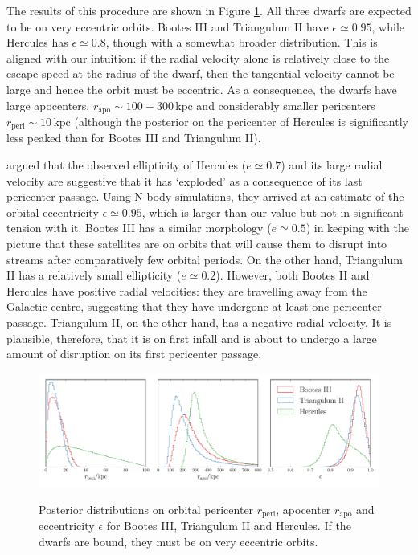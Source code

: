 \documentclass[useAMS,twocolumn,usenatbib]{mn2e}
\def\kpc{{\,\mathrm{kpc}}}
\def\rp{{r_\mathrm{peri}}}
\def\ra{{r_\mathrm{apo}}}
\def\ecc{{\epsilon}}
\begin{document}
The results of this procedure are shown in Figure \ref{fig:bootriherc}. 
All three dwarfs are expected to be on very eccentric orbits. 
Bootes III and Triangulum II have $\epsilon \simeq 0.95$, while Hercules has $\epsilon \simeq 0.8$, though with a somewhat broader distribution. 
This is aligned with our intuition: if the radial velocity alone is relatively close to the escape speed at the radius of the dwarf, then the tangential velocity cannot be large and hence the orbit must be eccentric. 
As a consequence, the dwarfs have large apocenters, $\ra \sim 100 - 300\kpc$ and considerably smaller pericenters $\rp \sim 10\kpc$ (although the posterior on the pericenter of Hercules is significantly less peaked than for Bootes III and Triangulum II).

\citet{Ku16} argued that the observed ellipticity of Hercules ($e \simeq 0.7$) and its large radial velocity are suggestive that it has `exploded' as a consequence of its last pericenter passage. 
Using N-body simulations, they arrived at an estimate of the orbital eccentricity $\ecc \simeq 0.95$, which is larger than our value but not in significant tension with it. 
Bootes III has a similar morphology ($e \simeq 0.5$) in keeping with the picture that these satellites are on orbits that will cause them to disrupt into streams after comparatively few orbital periods. 
On the other hand, Triangulum II has a relatively small ellipticity ($e \simeq 0.2$). 
However, both Bootes II and Hercules have positive radial velocities: they are travelling away from the Galactic centre, suggesting that they have undergone at least one pericenter passage. 
Triangulum II, on the other hand, has a negative radial velocity. 
It is plausible, therefore, that it is on first infall and is about to undergo a large amount of disruption on its first pericenter passage.

\begin{figure}
\includegraphics[width=2\columnwidth]{plots/boo_tri_herc}\\
\caption{Posterior distributions on orbital pericenter $r_\mathrm{peri}$, apocenter $r_\mathrm{apo}$ and eccentricity $\epsilon$ for Bootes III, Triangulum II and Hercules. 
If the dwarfs are bound, they must be on very eccentric orbits.}
\label{fig:bootriherc}
\end{figure}
\end{document}
